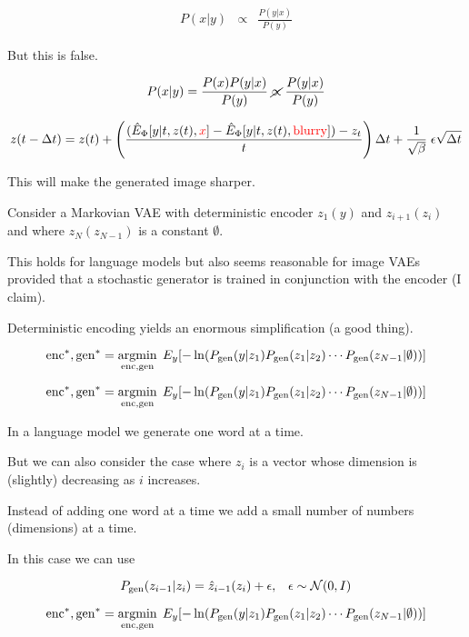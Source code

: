 {\vfill
{\huge \begin{eqnarray*}
P(x|y) & \propto & \frac{P(y|x)}{P(y)}
\end{eqnarray*}}

\vfill
But this is false.

\vfill
{\huge $$P(x|y) = \frac{P(x)P(y|x)}{P(y)} \;\cancel{\propto}\;\frac{P(y|x)}{P(y)}$$}


{\huge $$z(t - \Delta t) = z(t) + \left(\frac{(\hat{E}_\Phi[y|t,z(t),{\color{red} x}] - \hat{E}_\Phi[y|t,z(t),{\color{red} \mathrm{blurry}}]) - z_t}{t}\right)\Delta t
+ \frac{1}{\sqrt{\beta}}\;\epsilon\sqrt{\Delta t}$$}

\vfill
This will make the generated image sharper.


Consider a Markovian VAE with deterministic encoder $z_1(y)$ and $z_{i+1}(z_i)$ and where $z_N(z_{N-1})$ is a constant $\emptyset$.

\vfill
This holds for language models but also seems reasonable for image VAEs provided that a stochastic generator
is trained in conjunction with the encoder (I claim).

\vfill
Deterministic encoding yields an enormous simplification (a good thing).

{\huge
$$\mathrm{enc}^*,\mathrm{gen}^* = \operatorname*{argmin}_{\mathrm{enc},\mathrm{gen}} \;E_y[- \ln (P_{\mathrm{gen}}(y|z_1)P_{\mathrm{gen}}(z_1|z_2)\cdots P_{\mathrm{gen}}(z_{N-1}|\emptyset))]$$
}


{\huge
$$\mathrm{enc}^*,\mathrm{gen}^* = \operatorname*{argmin}_{\mathrm{enc},\mathrm{gen}} \;E_y[- \ln (P_{\mathrm{gen}}(y|z_1)P_{\mathrm{gen}}(z_1|z_2)\cdots P_{\mathrm{gen}}(z_{N-1}|\emptyset))]$$
}

\vfill
In a language model we generate one word at a time.

\vfill
But we can also consider the case where $z_i$ is a vector whose dimension is (slightly) decreasing as $i$ increases.

\vfill
Instead of adding one word at a time we add a small number of numbers (dimensions) at a time.

\vfill
In this case we can use

$$P_{\mathrm{gen}}(z_{i-1}|z_i) = \hat{z}_{i-1}(z_i) + \epsilon,\;\;\;\epsilon\sim {\cal N}(0,I)$$


{\huge
$$\mathrm{enc}^*,\mathrm{gen}^* = \operatorname*{argmin}_{\mathrm{enc},\mathrm{gen}} \;E_y[- \ln (P_{\mathrm{gen}}(y|z_1)P_{\mathrm{gen}}(z_1|z_2)\cdots P_{\mathrm{gen}}(z_{N-1}|\emptyset))]$$
}

}

